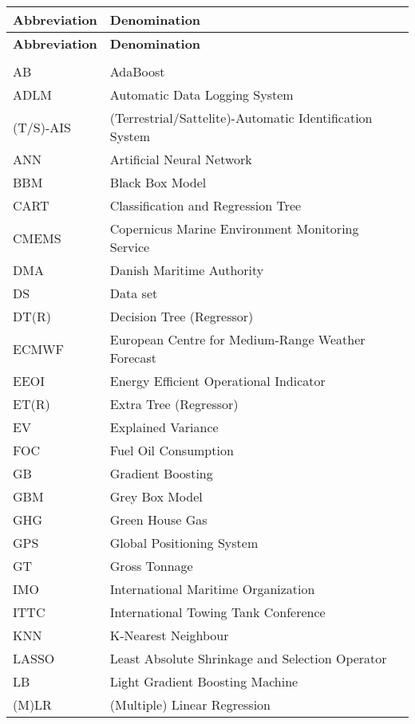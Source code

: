 \begin{longtable}[l]{>{}l<{}l}
  \textbf{Abbreviation} & \textbf{Denomination} \\[0.5ex] \hline%
  \endfirsthead%
  \textbf{Abbreviation} & \textbf{Denomination} \\[0.5ex] \hline%
  \endhead%
\renewcommand{\arraystretch}{1.4}\label{abbreviations}
&\\%
AB          & AdaBoost\\%
ADLM        & Automatic Data Logging System\\%
(T/S)-AIS   & (Terrestrial/Sattelite)-Automatic Identification System\\%
ANN         & Artificial Neural Network\\%
BBM         & Black Box Model\\%
CART        & Classification and Regression Tree\\%
CMEMS       & Copernicus Marine Environment Monitoring Service \\%
DMA         & Danish Maritime Authority \\%
DS          & Data set \\%
DT(R)       & Decision Tree (Regressor)\\%
ECMWF       & European Centre for Medium-Range Weather Forecast\\%
EEOI        & Energy Efficient Operational Indicator\\%
ET(R)       & Extra Tree (Regressor)\\%
EV          & Explained Variance \\%
FOC         & Fuel Oil Consumption\\%
GB          & Gradient Boosting\\%
GBM         & Grey Box Model \\%
GHG         & Green House Gas \\%
GPS         & Global Positioning System\\%
GT          & Gross Tonnage\\%
IMO         & International Maritime Organization\\%
ITTC        & International Towing Tank Conference \\%
KNN         & K-Nearest Neighbour\\%
LASSO       & Least Absolute Shrinkage and Selection Operator\\%
LB          & Light Gradient Boosting Machine\\%
(M)LR       & (Multiple) Linear Regression\\%

\end{longtable}

